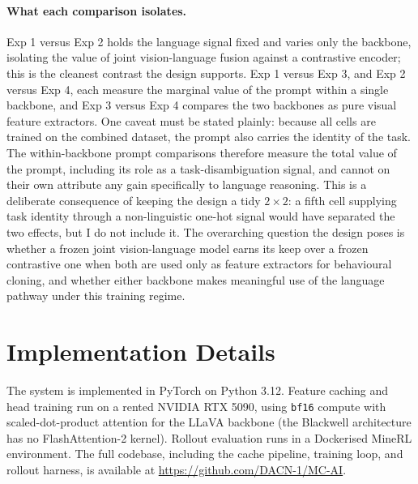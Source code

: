 \paragraph{What each comparison isolates.} Exp 1 versus Exp 2 holds the
language signal fixed and varies only the backbone, isolating the value of
joint vision-language fusion against a contrastive encoder; this is the
cleanest contrast the design supports. Exp 1 versus Exp 3, and Exp 2 versus
Exp 4, each measure the marginal value of the prompt within a single backbone,
and Exp 3 versus Exp 4 compares the two backbones as pure visual feature
extractors. One caveat must be stated plainly: because all cells are trained
on the combined dataset, the prompt also carries the identity of the task.
The within-backbone prompt comparisons therefore measure the total value of
the prompt, including its role as a task-disambiguation signal, and cannot on
their own attribute any gain specifically to language reasoning. This is a
deliberate consequence of keeping the design a tidy $2 \times 2$: a fifth cell
supplying task identity through a non-linguistic one-hot signal would have
separated the two effects, but I do not include it. The overarching question
the design poses is whether a frozen joint vision-language model earns its
keep over a frozen contrastive one when both are used only as feature
extractors for behavioural cloning, and whether either backbone makes
meaningful use of the language pathway under this training regime.

\section{Implementation Details}
The system is implemented in PyTorch on Python 3.12. Feature caching and head
training run on a rented NVIDIA RTX 5090, using \texttt{bf16} compute with
scaled-dot-product attention for the LLaVA backbone (the Blackwell
architecture has no FlashAttention-2 kernel). Rollout evaluation runs in a
Dockerised MineRL environment. The full codebase, including the cache
pipeline, training loop, and rollout harness, is available at
\url{https://github.com/DACN-1/MC-AI}.

